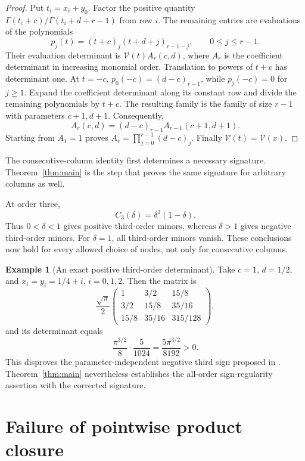 \documentclass[11pt,a4paper]{article}
\theoremstyle{definition}
\newtheorem{example}[theorem]{Example}
\theoremstyle{remark}
\newcommand{\V}{\mathcal V}
\begin{document}
\begin{proof}
Put \(t_i=x_i+y_0\). Factor the positive quantity
\(\Gamma(t_i+c)/\Gamma(t_i+d+r-1)\) from row \(i\).
The remaining entries are evaluations of the polynomials
\[
 p_j(t)=(t+c)_j(t+d+j)_{r-1-j},\qquad 0\le j\le r-1.
\]
Their evaluation determinant is \(\V(t)A_r(c,d)\), where \(A_r\)
is the coefficient determinant in increasing monomial order. Translation
to powers of \(t+c\) has determinant one. At \(t=-c\),
\(p_0(-c)=(d-c)_{r-1}\), while \(p_j(-c)=0\) for \(j\ge1\).
Expand the coefficient determinant along its constant row and divide
the remaining polynomials by \(t+c\). The resulting family is the
family of size \(r-1\) with parameters \(c+1,d+1\). Consequently,
\[
 A_r(c,d)=(d-c)_{r-1}A_{r-1}(c+1,d+1).
\]
Starting from \(A_1=1\) proves
\(A_r=\prod_{j=0}^{r-1}(d-c)_j\). Finally \(\V(t)=\V(x)\).
\end{proof}

The consecutive-column identity first determines a necessary signature.
Theorem~\ref{thm:main} is the step that proves the same signature for
arbitrary columns as well.

At order three,
\begin{equation}\label{eq:third}
 C_3(\delta)=\delta^2(1-\delta).
\end{equation}
Thus \(0<\delta<1\) gives positive third-order minors, whereas
\(\delta>1\) gives negative third-order minors. For \(\delta=1\), all
third-order minors vanish. These conclusions now hold for every allowed
choice of nodes, not only for consecutive columns.

\begin{example}[An exact positive third-order determinant]
Take \(c=1\), \(d=1/2\), and \(x_i=y_i=1/4+i\), \(i=0,1,2\).
Then the matrix is
\[
 \frac{\sqrt\pi}{2}
 \begin{pmatrix}
 1&3/2&15/8\\
 3/2&15/8&35/16\\
 15/8&35/16&315/128
 \end{pmatrix},
\]
and its determinant equals
\[
 \frac{\pi^{3/2}}{8}\cdot\frac{5}{1024}
 =\frac{5\pi^{3/2}}{8192}>0.
\]
This disproves the parameter-independent negative third sign proposed
in \cite[Section~3, Example~11]{KVZ}. Theorem~\ref{thm:main} nevertheless
establishes the all-order sign-regularity assertion with the corrected
signature.
\end{example}

\section{Failure of pointwise product closure}\label{pc:section}
\end{document}
